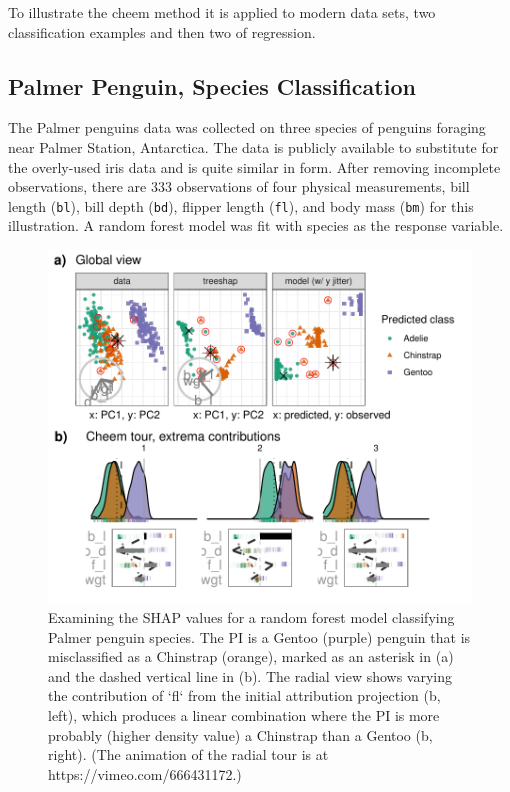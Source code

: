 \documentclass[
]{sn-jnl}
\begin{document}
To illustrate the cheem method it is applied to modern data sets, two
classification examples and then two of regression.

\hypertarget{palmer-penguin-species-classification}{%
\subsection{Palmer Penguin, Species
Classification}\label{palmer-penguin-species-classification}}

The Palmer penguins data
\citep{gorman_ecological_2014, horst_palmerpenguins_2020} was collected
on three species of penguins foraging near Palmer Station, Antarctica.
The data is publicly available to substitute for the overly-used iris
data and is quite similar in form. After removing incomplete
observations, there are 333 observations of four physical measurements,
bill length (\texttt{bl}), bill depth (\texttt{bd}), flipper length
(\texttt{fl}), and body mass (\texttt{bm}) for this illustration. A
random forest model was fit with species as the response variable.

\begin{CodeChunk}
\begin{figure}

{\centering \includegraphics[width=1\linewidth]{./figures/case_penguins} 

}

\caption[Examining the SHAP values for a random forest model classifying Palmer penguin species]{Examining the SHAP values for a random forest model classifying Palmer penguin species. The PI is a Gentoo (purple) penguin that is misclassified as a Chinstrap (orange), marked as an asterisk in (a) and the dashed vertical line in (b). The radial view shows varying the contribution of `fl` from the initial attribution projection (b, left), which produces a linear combination where the PI is more probably (higher density value) a Chinstrap than a Gentoo (b, right). (The animation of the radial tour is at https://vimeo.com/666431172.)}\label{fig:casepenguins}
\end{figure}
\end{CodeChunk}
\end{document}
